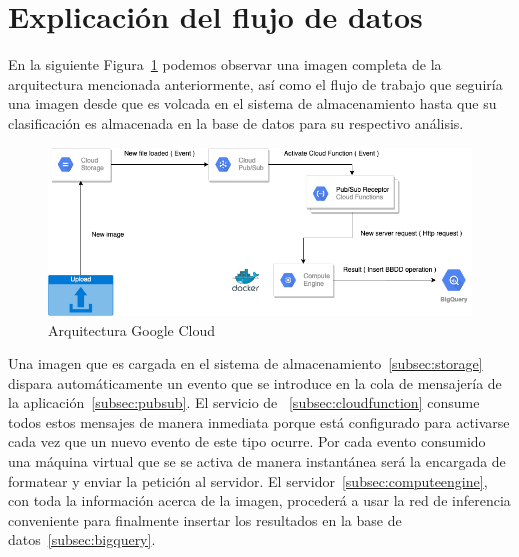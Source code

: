 \section{Explicación del flujo de datos}\label{sec:explicación-del-flujo-de-la-arquitectura}
En la siguiente Figura~\ref{fig:Arquitectura Google Cloud} podemos observar una imagen completa de la arquitectura mencionada anteriormente, así como el flujo de trabajo que seguiría una imagen desde que es volcada en el sistema de almacenamiento hasta que su clasificación es almacenada en la base de datos para su respectivo análisis.
\begin{figure}
    \centering
    \includegraphics[width=1.0\textwidth]{images/chapter4/google_cloud_architecture.png}
    \caption{Arquitectura Google Cloud}
    \label{fig:Arquitectura Google Cloud}
\end{figure}
Una imagen que es cargada en el sistema de almacenamiento~\ref{subsec:storage} dispara automáticamente un evento que se introduce en la cola de mensajería de la aplicación~\ref{subsec:pubsub}.
El servicio de ~\ref{subsec:cloudfunction} consume todos estos mensajes de manera inmediata porque está configurado para activarse cada vez que un nuevo evento de este tipo ocurre.
Por cada evento consumido una máquina virtual que se se activa de manera instantánea será la encargada de formatear y enviar la petición al servidor.
El servidor~\ref{subsec:computeengine}, con toda la información acerca de la imagen, procederá a usar la red de inferencia conveniente para finalmente insertar los resultados en la base de datos~\ref{subsec:bigquery}.

